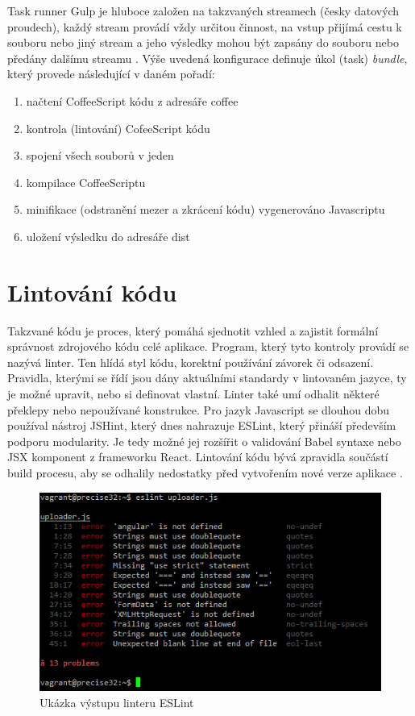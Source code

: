Task runner Gulp je hluboce založen na takzvaných streamech (česky datových proudech), každý stream provádí vždy určitou činnost, na vstup přijímá cestu k souboru nebo jiný stream a jeho výsledky mohou být zapsány do souboru nebo předány dalšímu streamu \cite{gulp_web}. Výše uvedená konfigurace definuje úkol (task) \textit{bundle}, který provede následující v daném pořadí:
\begin{enumerate}
\item načtení CoffeeScript kódu z adresáře coffee
\item kontrola (lintování) CofeeScript kódu
\item spojení všech souborů v jeden
\item kompilace CoffeeScriptu
\item minifikace (odstranění mezer a zkrácení kódu) vygenerováno Javascriptu
\item uložení výsledku do adresáře dist
\end{enumerate}

\section{Lintování kódu}
Takzvané  kódu je proces, který pomáhá sjednotit vzhled a zajistit formální správnost zdrojového kódu celé aplikace. Program, který tyto kontroly provádí se nazývá linter. Ten hlídá styl kódu, korektní používání závorek či odsazení. Pravidla, kterými se řídí jsou dány aktuálními standardy v lintovaném jazyce, ty je možné upravit, nebo si definovat vlastní. Linter také umí odhalit některé překlepy nebo nepoužívané konstrukce. Pro jazyk Javascript se dlouhou dobu používal nástroj JSHint, který dnes nahrazuje ESLint, který přináší především podporu modularity. Je tedy možné jej rozšířit o validování Babel syntaxe nebo JSX komponent z frameworku React. Lintování kódu bývá zpravidla součástí build procesu, aby se odhalily nedostatky před vytvořením nové verze aplikace \cite{flanagan_javascript} \cite{linter}.

\begin{figure}[h]
\begin{centering}
\includegraphics[scale=0.6]{obrazky/linter}
\par\end{centering}
\caption{Ukázka výstupu linteru ESLint \cite{linter} \label{fig:linter}}
\end{figure}
\FloatBarrier


